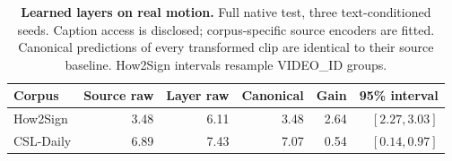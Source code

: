 \begin{table}[t]
\centering\small
\caption{\textbf{Learned layers on real motion.} Full native test, three text-conditioned seeds. Caption access is disclosed; corpus-specific source encoders are fitted. Canonical predictions of every transformed clip are identical to their source baseline. How2Sign intervals resample VIDEO\_ID groups.}
\label{tab:reallayers}
\begin{tabular}{lrrrrr}\toprule
Corpus&Source raw&Layer raw&Canonical&Gain&95\% interval\\\midrule
How2Sign&3.48&6.11&3.48&2.64&$[2.27,3.03]$\\
CSL-Daily&6.89&7.43&7.07&0.54&$[0.14,0.97]$\\
\bottomrule\end{tabular}\end{table}
